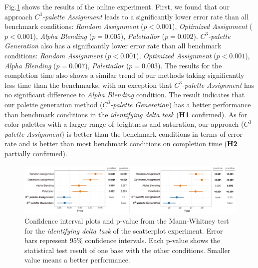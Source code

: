 {
Fig.\ref{fig:difference-results} shows the results of the online experiment.
First, we found that our approach \emph{$C^3$-palette Assignment} leads to a significantly lower error rate than all benchmark conditions: \emph{Random Assignment} ($p<0.001$), \emph{Optimized Assignment} ($p<0.001$), \emph{Alpha Blending} ($p=0.005$), \emph{Palettailor} ($p=0.002$). \emph{$C^3$-palette Generation} also has a significantly lower error rate than all benchmark conditions: \emph{Random Assignment} ($p<0.001$), \emph{Optimized Assignment} ($p<0.001$), \emph{Alpha Blending} ($p=0.007$), \emph{Palettailor} ($p=0.003$).
The results for the completion time also shows a similar trend of our methods taking significantly less time than the benchmarks, with an exception that \emph{$C^3$-palette Assignment} has no significant difference to \emph{Alpha Blending} condition.
The result indicates that our palette generation method (\emph{$C^3$-palette Generation}) has a better performance than benchmark conditions in the \emph{identifying delta task} (\textbf{H1} confirmed). As for color palettes with a larger range of brightness and saturation, our approach (\emph{$C^3$-palette Assignment}) is better than the benchmark conditions in terms of error rate and is better than most benchmark conditions on completion time (\textbf{H2} partially confirmed).

\begin{figure}[!tb]
\centering
\includegraphics[width=1\linewidth]{figures/difference-results.pdf}
\caption{Confidence interval plots and p-value from the Mann-Whitney test for the \emph{identifying delta task} of the scatterplot experiment. Error bars represent $95\%$ confidence intervals. Each p-value shows the statistical test result of one base with the other conditions. Smaller value means a better performance.}
\vspace*{-3mm}
\label{fig:difference-results}
\end{figure}


}
